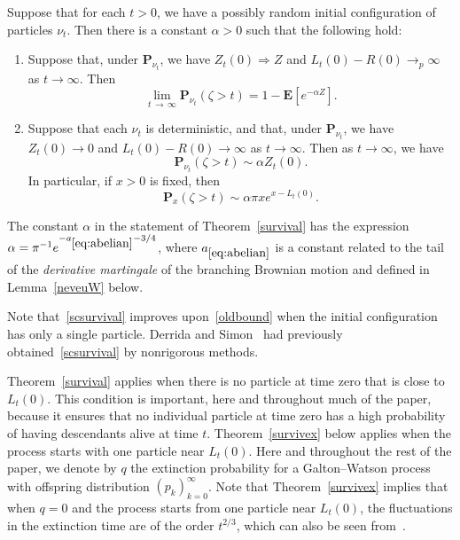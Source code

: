 \documentclass[AHL,Unicode,longabstracts,published]{cedram}
\newcommand*\E{\mathbf{E}}
\renewcommand*\P{\mathbf{P}}
\newcommand{\1} {\mathds{1}}
\begin{document}
\begin{theo}\label{survival}
Suppose that for each $t > 0$, we have a possibly random initial configuration of particles $\nu_t$. Then there is a constant $\alpha > 0$ such that the following hold:
\begin{enumerate}
\item\label{theo1.1.1} Suppose that, under $\P_{\nu_t}$, we have $Z_t(0) \Rightarrow Z$ and $L_t(0) - R(0) \rightarrow_p \infty$ as $t \rightarrow \infty$. Then
\[
\lim_{t\,\rightarrow\,\infty} \P_{\nu_t}(\zeta > t) = 1 - \E\left[e^{-\alpha Z}\right].
\]

\item\label{theo1.1.2} Suppose that each $\nu_t$ is deterministic, and that, under $\P_{\nu_t}$, we have $Z_t(0) \rightarrow 0$ and $L_t(0) - R(0) \rightarrow \infty$ as $t \rightarrow \infty$. Then as $t \rightarrow \infty$, we have
\[
\P_{\nu_t}(\zeta > t) \sim \alpha Z_t(0).
\]
In particular, if $x > 0$ is fixed, then
\begin{equation}\label{scsurvival}
\P_x(\zeta > t) \sim \alpha \pi x e^{x-L_t(0)}.
\end{equation}
\end{enumerate}
\end{theo}

\begin{rema}
The constant $\alpha$ in the statement of Theorem~\ref{survival} has the expression $\alpha = \pi^{-1}e^{-a_{\eqref{eq:abelian}}-3/4}$, where $a_{\eqref{eq:abelian}}$ is a constant related to the tail of the \emph{derivative martingale} of the branching Brownian motion and defined in Lemma~\ref{neveuW} below.
\end{rema}

Note that~\eqref{scsurvival} improves upon~\eqref{oldbound} when the initial configuration has only a single particle. Derrida and Simon~\cite{ds07} had previously obtained~\eqref{scsurvival} by nonrigorous methods.

Theorem~\ref{survival} applies when there is no particle at time zero that is close to $L_t(0)$. This condition is important, here and throughout much of the paper, because it ensures that no individual particle at time zero has a high probability of having descendants alive at time $t$. Theorem~\ref{survivex} below applies when the process starts with one particle near $L_t(0)$. Here and throughout the rest of the paper, we denote by $q$ the extinction probability for a Galton--Watson process with offspring distribution $(p_k)_{k=0}^{\infty}$. Note that Theorem~\ref{survivex} implies that when $q = 0$ and the process starts from one particle near $L_t(0)$, the fluctuations in the extinction time are of the order $t^{2/3}$, which can also be seen from~\cite[Theorem~2]{bbs}.
\end{document}
